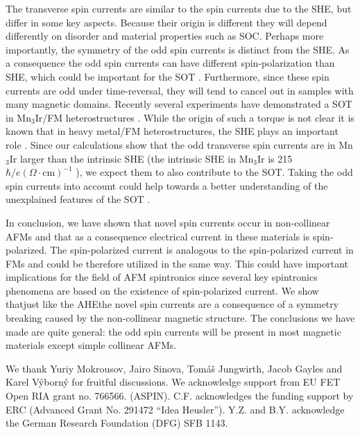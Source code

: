 \documentclass[aps,prl,reprint,amsmath,amssymb,superscriptaddress]{revtex4-1}
\begin{document}
The transverse spin currents are similar to the spin currents due to the SHE, but differ in some key aspects. Because their origin is different they will depend differently on disorder and material properties such as SOC. Perhaps more importantly, the symmetry of the odd spin currents is distinct from the SHE. As a consequence the odd spin currents can have different spin-polarization than SHE, which could be important for the SOT \cite{MacNeill2016}. Furthermore, since these spin currents are odd under time-reversal, they will tend to cancel out in samples with many magnetic domains. Recently several experiments have demonstrated a SOT in Mn$_3$Ir/FM heterostructures \cite{Tshitoyan2015,Zhang2016,Oh2016,Wu2016}. While the origin of such a torque is not clear \cite{Oh2016} it is known that in heavy metal/FM heterostructures, the SHE plays an important role \cite{Fan2014,freimuth2014}. Since our calculations show that the odd transverse spin currents are in Mn$_3$Ir larger than the intrinsic SHE (the intrinsic SHE in Mn$_3$Ir is 215 $\hbar/e (\Omega \cdot \text{cm})^{-1}$ \cite{YangZhang2017}), we expect them to also contribute to the SOT. Taking the odd spin currents into account could help towards a better understanding of the unexplained features of the SOT \cite{Oh2016}.

In conclusion, we have shown that novel spin currents occur in non-collinear AFMs and that as a consequence electrical current in these materials is spin-polarized. The spin-polarized current is analogous to the spin-polarized current in FMs and could be therefore utilized in the same way. This could have important implications for the field of AFM spintronics since several key spintronics phenomena are based on the existence of spin-polarized current. We show that\textemdash just like the AHE\textemdash the novel spin currents are a consequence of a symmetry breaking caused by the non-collinear magnetic structure. The conclusions we have made are quite general: the odd spin currents will be present in most magnetic materials except simple collinear AFMs.

\begin{acknowledgments}
We thank Yuriy Mokrousov, Jairo Sinova, Tom\'a\v{s} Jungwirth, Jacob Gayles and Karel V\'{y}born\'{y} for fruitful discussions. We acknowledge support from EU FET Open RIA grant no. 766566. (ASPIN). C.F. acknowledges the funding
support by ERC (Advanced Grant No. 291472 “Idea Heusler”).
Y.Z. and B.Y. acknowledge the German Research Foundation
(DFG) SFB 1143. 
\end{acknowledgments}


%
\end{document}
